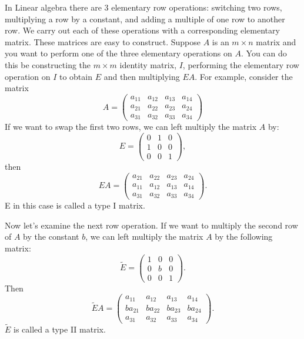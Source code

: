 \label{lab:LUdecomp}

In Linear algebra there are 3 elementary row operations: switching two rows, multiplying a row by a constant, and adding a multiple of one row to another row.
We carry out each of these operations with a corresponding elementary matrix.
These matrices are easy to construct.
Suppose $A$ is an $m \times n$ matrix and you want to perform one of the three elementary operations on $A$.
You can do this be constructing the $m \times m$ identity matrix, $I$, performing the elementary row operation on $I$ to obtain $E$ and then multiplying $EA$.
For example, consider the matrix
\[
A = \begin{pmatrix}
a_{11}&a_{12}&a_{13}&a_{14}\\
a_{21}&a_{22}&a_{23}&a_{24}\\
a_{31}&a_{32}&a_{33}&a_{34}
\end{pmatrix}
\]
If we want to swap the first two rows, we can left multiply the
matrix $A$ by:
\[
E = \begin{pmatrix}
0&1&0\\
1&0&0\\
0&0&1
\end{pmatrix},
\]
then
\[
E A =
\begin{pmatrix}
a_{21}&a_{22}&a_{23}&a_{24}\\
a_{11}&a_{12}&a_{13}&a_{14}\\
a_{31}&a_{32}&a_{33}&a_{34}
\end{pmatrix}.
\]
E in this case is called a type I matrix.

Now let's examine the next row operation.
If we want to multiply the second row of $A$ by the constant $b$, we can left multiply the matrix $A$ by the following matrix:
\[
\tilde{E} = \begin{pmatrix}
1&0&0\\
0&b&0\\
0&0&1
\end{pmatrix}.
\]
Then
\[
\tilde{E} A =
\begin{pmatrix}
a_{11}&a_{12}&a_{13}&a_{14}\\
b a_{21}&b a_{22}&b a_{23}&b a_{24}\\
a_{31}&a_{32}&a_{33}&a_{34}
\end{pmatrix}.
\]
$\tilde{E}$ is called a type II matrix.  

